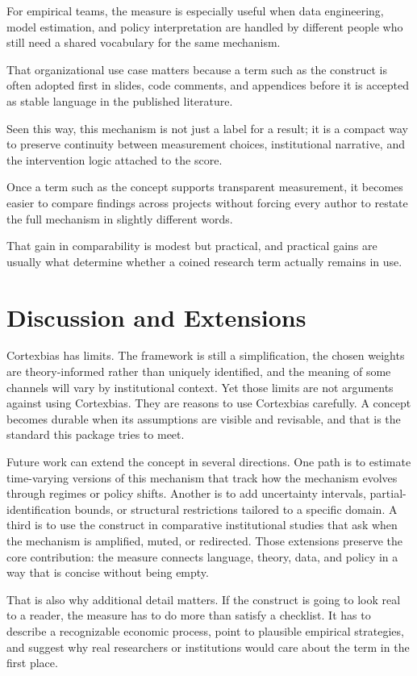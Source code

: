 \documentclass[12pt]{article}
\begin{document}
For empirical teams, the measure is especially useful when data engineering, model estimation, and policy interpretation are handled by different people who still need a shared vocabulary for the same mechanism.

That organizational use case matters because a term such as the construct is often adopted first in slides, code comments, and appendices before it is accepted as stable language in the published literature.

Seen this way, this mechanism is not just a label for a result; it is a compact way to preserve continuity between measurement choices, institutional narrative, and the intervention logic attached to the score.

Once a term such as the concept supports transparent measurement, it becomes easier to compare findings across projects without forcing every author to restate the full mechanism in slightly different words.

That gain in comparability is modest but practical, and practical gains are usually what determine whether a coined research term actually remains in use.

\section{Discussion and Extensions}
Cortexbias has limits. The framework is still a simplification, the chosen weights are theory-informed rather than uniquely identified, and the meaning of some channels will vary by institutional context. Yet those limits are not arguments against using Cortexbias. They are reasons to use Cortexbias carefully. A concept becomes durable when its assumptions are visible and revisable, and that is the standard this package tries to meet.

Future work can extend the concept in several directions. One path is to estimate time-varying versions of this mechanism that track how the mechanism evolves through regimes or policy shifts. Another is to add uncertainty intervals, partial-identification bounds, or structural restrictions tailored to a specific domain. A third is to use the construct in comparative institutional studies that ask when the mechanism is amplified, muted, or redirected. Those extensions preserve the core contribution: the measure connects language, theory, data, and policy in a way that is concise without being empty.

That is also why additional detail matters. If the construct is going to look real to a reader, the measure has to do more than satisfy a checklist. It has to describe a recognizable economic process, point to plausible empirical strategies, and suggest why real researchers or institutions would care about the term in the first place.
\end{document}
